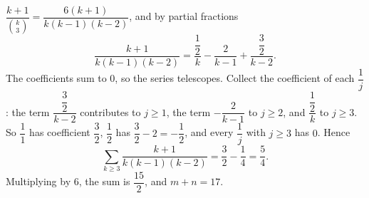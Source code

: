$\dfrac{k+1}{\binom k3}=\dfrac{6(k+1)}{k(k-1)(k-2)}$, and by partial fractions
\[\dfrac{k+1}{k(k-1)(k-2)}=\dfrac{\dfrac12}{k}-\dfrac{2}{k-1}+\dfrac{\dfrac32}{k-2}.\]
The coefficients sum to $0$, so the series telescopes. Collect the coefficient of each $\dfrac1j$: the term $\dfrac{\dfrac32}{k-2}$ contributes to $j\ge1$, the term $-\dfrac2{k-1}$ to $j\ge2$, and $\dfrac{\dfrac12}{k}$ to $j\ge3$. So $\dfrac11$ has coefficient $\dfrac32$, $\dfrac12$ has $\dfrac32-2=-\dfrac12$, and every $\dfrac1j$ with $j\ge3$ has $0$. Hence
\[\sum_{k\ge3}\dfrac{k+1}{k(k-1)(k-2)}=\dfrac32-\dfrac14=\dfrac54.\]
Multiplying by $6$, the sum is $\dfrac{15}2$, and $m+n=\boxed{17}$.
